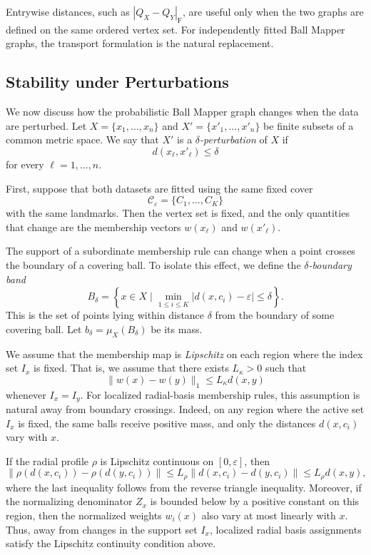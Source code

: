 \documentclass[9pt,a4paper,twocolumn,twoside]{extarticle}
\theoremstyle{definition}
\begin{document}
Entrywise distances, such as $|Q_X-Q_Y|_{\mathrm F}$, are useful only when the two graphs are defined on the same ordered vertex set. For independently fitted Ball Mapper graphs, the transport formulation is the natural replacement.

\subsection{Stability under Perturbations}

We now discuss how the probabilistic Ball Mapper graph changes when the data are perturbed. Let $X= \{x_1,\dots,x_n\}$ and $X'= \{x'_1,\dots,x'_n\}$ be finite subsets of a common metric space. We say that $X'$ is a \emph{$\delta$-perturbation} of $X$ if
\[
d(x_\ell,x'_\ell) \le \delta
\]
for every $\ell=1,\dots,n$.

First, suppose that both datasets are fitted using the same fixed cover
\[
\mathcal C_\varepsilon= \{C_1,\dots,C_K\}
\]
with the same landmarks. Then the vertex set is fixed, and the only quantities that change are the membership vectors $w(x_\ell)$ and $w(x'_\ell)$.

The support of a subordinate membership rule can change when a point crosses the boundary of a covering ball. To isolate this effect, we define the \emph{$\delta$-boundary band}
\[
B_\delta = \left\{x\in X \mid \min_{1\le i\le K} |d(x,c_i) - \varepsilon| \le \delta \right\}.
\]
This is the set of points lying within distance $\delta$ from the boundary of some covering ball. Let $b_\delta=\mu_X(B_\delta)$ be its mass.

We assume that the membership map is \emph{Lipschitz} on each region where the index set $I_x$ is fixed. That is, we assume that there exists $L_\kappa>0$ such that
\[
\|w(x)-w(y)\|_1 \le L_\kappa d(x,y)
\]
whenever $I_x = I_y$. For localized radial-basis membership rules, this assumption is natural away from boundary crossings. Indeed, on any region where the active set $I_x$ is fixed, the same balls receive positive mass, and only the distances $d(x,c_i)$ vary with $x$. 

If the radial profile $\rho$ is Lipschitz continuous on $[0,\varepsilon]$, then
\[
\|\rho(d(x,c_i))-\rho(d(y,c_i))\| \leq L_\rho \|d(x,c_i)-d(y,c_i)\| \leq L_\rho d(x,y),
\]
where the last inequality follows from the reverse triangle inequality. Moreover, if the normalizing denominator $Z_x$ is bounded below by a positive constant on this region, then the normalized weights $w_i(x)$ also vary at most linearly with $x$. Thus, away from changes in the support set $I_x$, localized radial basis assignments satisfy the Lipschitz continuity condition above.
\end{document}
